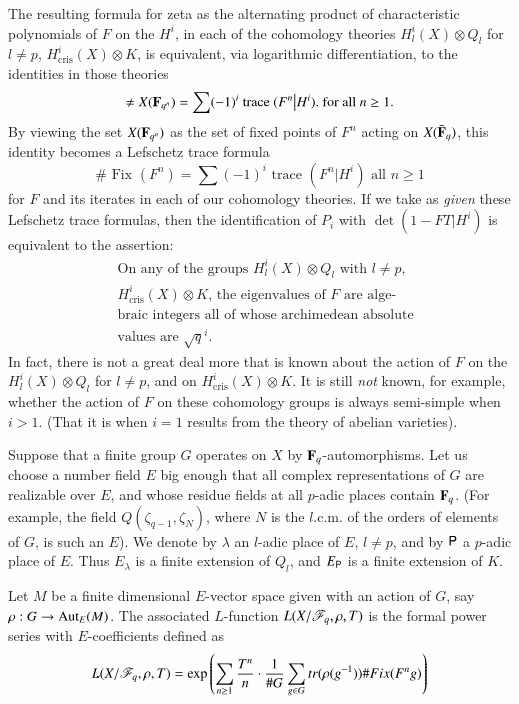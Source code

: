 The resulting formula for zeta as the alternating product of characteristic polynomials of $F$ on the $H^i$, in each of the cohomology theories $H^i_l (X) \otimes Q_l$ for $l \neq p$, $H^i_{\text{cris}} (X) \otimes K$, is equivalent, via logarithmic differentiation, to the identities in those theories 
$$
\neq X (\mathbf{F}_{q^n}) = \sum (-1)^i \text{ trace } (F^n \big| H^i). \text{ for all } n \geq 1.
$$
By viewing the set $X(\mathbf{F}_{q^n})$ as the set of fixed points of $F^n$ acting on $X(\bar{\mathbf{F}}_q)$, this identity becomes a Lefschetz trace formula
$$
\# \text{ Fix } (F^n ) =\sum(-1)^i \text{ trace } (F^n \big| H^i) \text{ all } n \geq 1
$$
for $F$ and its iterates in each of our cohomology theories. If we take as \textit{given} these Lefschetz trace formulas, then the identification of $P_i$ with $\det (1 - F T \big| H^i)$ is equivalent to the assertion:
\begin{align*}
&\text{On any of the groups $H^i_l(X) \otimes Q_l$ with $l \neq p$,}\\
&\text{$H^i_{\text{cris}} (X) \otimes K$, the eigenvalues of $F$ are alge-}\\
&\text{braic integers all of whose archimedean absolute}\\
&\text{values are $\sqrt{q}^i$.}
\end{align*}
In fact, there is not a great deal more that is known about the action of $F$ on the $H^i_l(X) \otimes Q_l$ for $l \neq p$, and on $H^i_{\text{cris}} (X)  \otimes K$. It is still \textit{not} known, for example, whether the action of $F$ on these cohomology groups is always semi-simple when $i>1$. (That it is when $i =1$ results from the theory of abelian varieties).

Suppose that a finite group $G$ operates on $X$ by $\mathbf{F}_q$-automorphisms. Let us choose a number field $E$ big enough that all complex representations of $G$ are realizable over $E$, and whose residue fields at all $p$-adic places contain $\mathbf{F}_q$. (For example, the field $Q(\zeta_{q-1}, \zeta_N)$, where $N$ is the $l$.c.m. of the orders of elements of $G$, is such an $E$). We denote by $\lambda$ an $l$-adic place of $E$, $l \neq p$, and by $\mathsf{P}$ a $p$-adic place of $E$. Thus $E_\lambda$ is a finite extension of $Q_l$, and $E_{\mathsf{P}}$ is a finite extension of $K$.

Let $M$ be a finite dimensional $E$-vector space given with an action of $G$, say $\rho : G \to \operatorname{Aut}_E (M)$. The associated $L$-function $L(X/\mathscr{F}_q, \rho, T)$ is the formal power series with $E$-coefficients defined as 
$$
L(X/\mathscr{F}_q, \rho, T) = \exp \left(\sum\limits_{n \geq 1} \frac{T^n}{n} \cdot \frac{1}{\# G} \sum\limits_{g \in G} tr (\rho (g^{-1})) \# Fix (F^n g) \right)
$$\pageoriginale


